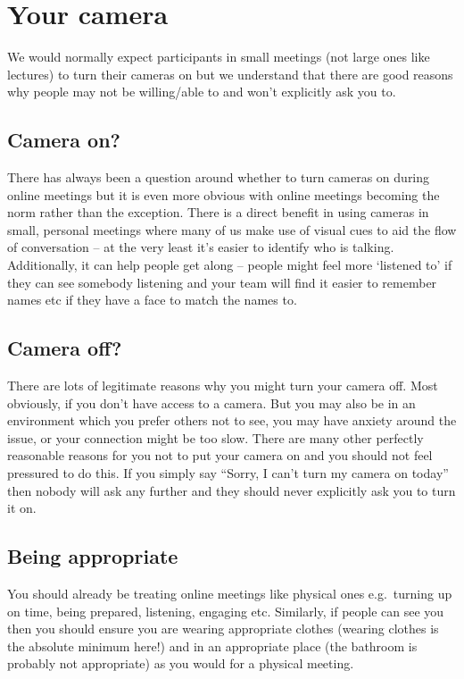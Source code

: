 \documentclass[
]{book}
\begin{document}
\hypertarget{cameras}{%
\section{Your camera}\label{cameras}}

We would normally expect participants in small meetings (not large ones like lectures) to turn their cameras on but we understand that there are good reasons why people may not be willing/able to and won't explicitly ask you to.

\hypertarget{on}{%
\subsection{Camera on?}\label{on}}

There has always been a question around whether to turn cameras on during online meetings but it is even more obvious with online meetings becoming the norm rather than the exception. There is a direct benefit in using cameras in small, personal meetings where many of us make use of visual cues to aid the flow of conversation -- at the very least it's easier to identify who is talking. Additionally, it can help people get along -- people might feel more `listened to' if they can see somebody listening and your team will find it easier to remember names etc if they have a face to match the names to.

\hypertarget{off}{%
\subsection{Camera off?}\label{off}}

There are lots of legitimate reasons why you might turn your camera off. Most obviously, if you don't have access to a camera. But you may also be in an environment which you prefer others not to see, you may have anxiety around the issue, or your connection might be too slow. There are many other perfectly reasonable reasons for you not to put your camera on and you should not feel pressured to do this. If you simply say ``Sorry, I can't turn my camera on today'' then nobody will ask any further and they should never explicitly ask you to turn it on.

\hypertarget{being}{%
\subsection{Being appropriate}\label{being}}

You should already be treating online meetings like physical ones e.g.~turning up on time, being prepared, listening, engaging etc. Similarly, if people can see you then you should ensure you are wearing appropriate clothes (wearing clothes is the absolute minimum here!) and in an appropriate place (the bathroom is probably not appropriate) as you would for a physical meeting.
\end{document}
